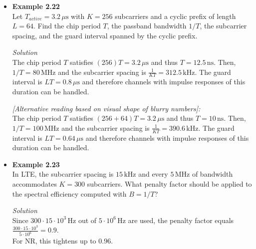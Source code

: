 \documentclass[a4paper, 12pt]{book}
\begin{document}
\begin{itemize}[leftmargin=0pt, label={}]
    \item \textbf{Example 2.22} \\
    Let $T_{active} = 3.2 \, \mu\mathrm{s}$ with $K=256$ subcarriers and a cyclic prefix of length $L=64$.
    Find the chip period $T$, the passband bandwidth $1/T$, the subcarrier spacing, and the guard interval spanned by the cyclic prefix.
    
    \textit{Solution} \\
    The chip period $T$ satisfies $(256)T = 3.2 \, \mu\mathrm{s}$ and thus $T=12.5 \, \mathrm{ns}$. Then, $1/T = 80 \, \mathrm{MHz}$ and the subcarrier spacing is $\frac{1}{KT} = 312.5 \, \mathrm{kHz}$. The guard interval is $LT = 0.8 \, \mu\mathrm{s}$ and therefore channels with impulse responses of this duration can be handled.
    
    \textit{[Alternative reading based on visual shape of blurry numbers]:} \\
    The chip period $T$ satisfies $(256+64)T = 3.2 \, \mu\mathrm{s}$ and thus $T = 10 \, \mathrm{ns}$. Then, $1/T = 100 \, \mathrm{MHz}$ and the subcarrier spacing is $\frac{1}{KT} = 390.6 \, \mathrm{kHz}$. The guard interval is $LT = 0.64 \, \mu\mathrm{s}$ and therefore channels with impulse responses of this duration can be handled.

    \item \textbf{Example 2.23} \\
    In LTE, the subcarrier spacing is $15 \, \mathrm{kHz}$ and every $5 \, \mathrm{MHz}$ of bandwidth accommodates $K=300$ subcarriers. What penalty factor should be applied to the spectral efficiency computed with $B=1/T$?
    
    \textit{Solution} \\
    Since $300 \cdot 15 \cdot 10^3 \, \mathrm{Hz}$ out of $5 \cdot 10^6 \, \mathrm{Hz}$ are used, the penalty factor equals $\frac{300 \cdot 15 \cdot 10^3}{5 \cdot 10^6} = 0.9$. \\
    For NR, this tightens up to $0.96$.
\end{itemize}
\end{document}
